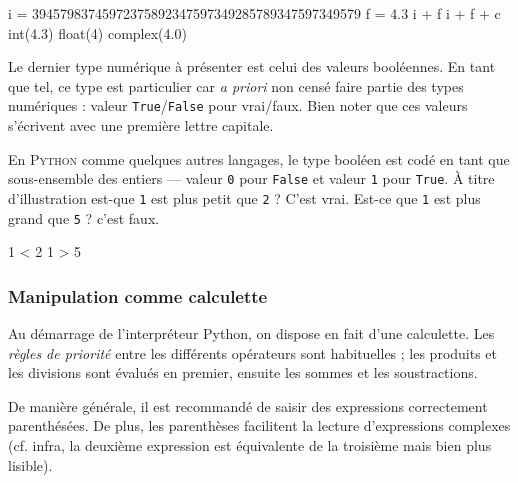 \begin{idleconsole}
	\begin{pyconsole}
		i = 39457983745972375892347597349285789347597349579
		f = 4.3
		i + f
		i + f + c
		int(4.3)
		float(4)
		complex(4.0)
	\end{pyconsole}
\end{idleconsole}

\vspace{2pt}


Le dernier type numérique à présenter est celui des valeurs booléennes. En tant que tel, ce type est particulier car \textit{a priori} non censé faire partie des types numériques : valeur \texttt{True}/\texttt{False} pour vrai/faux. Bien noter que ces valeurs s'écrivent avec une première lettre capitale.

En \textsc{Python} comme quelques autres langages, le type booléen est codé en tant que sous-ensemble des entiers --- valeur \texttt{0} pour \texttt{False} et valeur \texttt{1} pour \texttt{True}. À titre d'illustration est-que \texttt{1} est plus petit que \texttt{2} ? C'est vrai. Est-ce que \texttt{1} est plus grand que \texttt{5} ? c'est faux. 

\begin{idleconsole}
	\begin{pyconsole}
		1 < 2
		1 > 5
	\end{pyconsole}
\end{idleconsole}


\subsubsection[Manipulation comme calculette]{Manipulation comme calculette}
\label{subsub:X.3.1.2}

Au démarrage de l'interpréteur Python, on dispose en fait d'une calculette. Les \emph{règles de priorité} entre les différents opérateurs sont habituelles ; les produits et les divisions sont évalués en premier, ensuite les sommes et les soustractions.

\begin{linewidthnote}
De manière générale, il est recommandé de saisir des expressions correctement parenthésées. De plus, les parenthèses facilitent la lecture d'expressions complexes (cf. infra, la deuxième expression est équivalente de la troisième mais bien plus lisible).
\end{linewidthnote}

